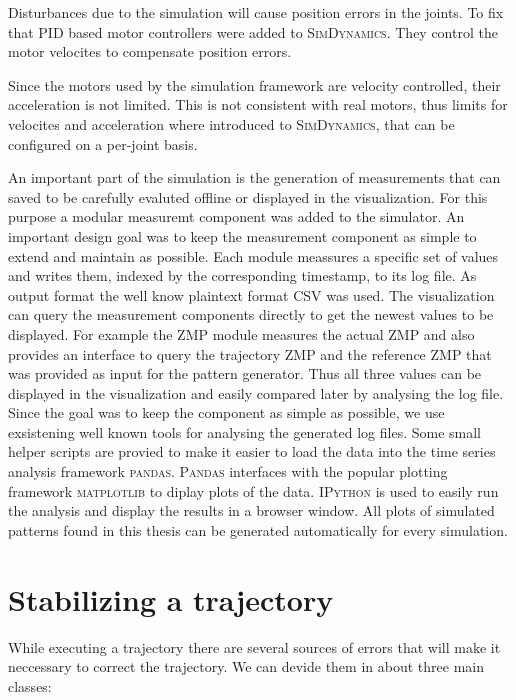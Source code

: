 \documentclass[english,ngerman]{KITreprt}
\newcommand{\clr}[2]{{\color{#1}{#2}}}
\newcommand{\todo}[1]{\marginpar{\clr{red}{#1}}}
\newcommand{\name}[1]{\textsc{#1}}
\begin{document}
Disturbances due to the simulation will cause position errors in the
joints. To fix that PID based motor controllers were added to
\name{SimDynamics}. They control the motor velocites to compensate
position errors.

Since the motors used by the simulation framework are velocity
controlled, their acceleration is not limited. This is not consistent
with real motors, thus limits for velocites and acceleration where
introduced to \name{SimDynamics}, that can be configured on a per-joint
basis.

An important part of the simulation is the generation of measurements
that can saved to be carefully evaluted offline or displayed in the
visualization. For this purpose a modular measuremt component was added
to the simulator. An important design goal was to keep the measurement
component as simple to extend and maintain as possible. Each module
meassures a specific set of values and writes them, indexed by the
corresponding timestamp, to its log file. As output format the well know
plaintext format CSV was used. The visualization can query the
measurement components directly to get the newest values to be
displayed. For example the ZMP module measures the actual ZMP and also
provides an interface to query the trajectory ZMP and the reference ZMP
that was provided as input for the pattern generator. Thus all three
values can be displayed in the visualization and easily compared later
by analysing the log file. Since the goal was to keep the component as
simple as possible, we use exsistening well known tools for analysing
the generated log files. Some small helper scripts are provied to make
it easier to load the data into the time series analysis framework
\name{pandas}. \name{Pandas} interfaces with the popular plotting
framework \name{matplotlib} to diplay plots of the data. \name{IPython}
is used to easily run the analysis and display the results in a browser
window. All plots of simulated patterns found in this thesis can be
generated automatically for every simulation.

\todo{Screenshot of analysis software}

\chapter{Stabilizing a trajectory}\label{stabilizing-a-trajectory}

\todo{More introduction: Most stabilizers are propritary and very robot specific.}

While executing a trajectory there are several sources of errors that
will make it neccessary to correct the trajectory. We can devide them in
about three main classes:
\end{document}

